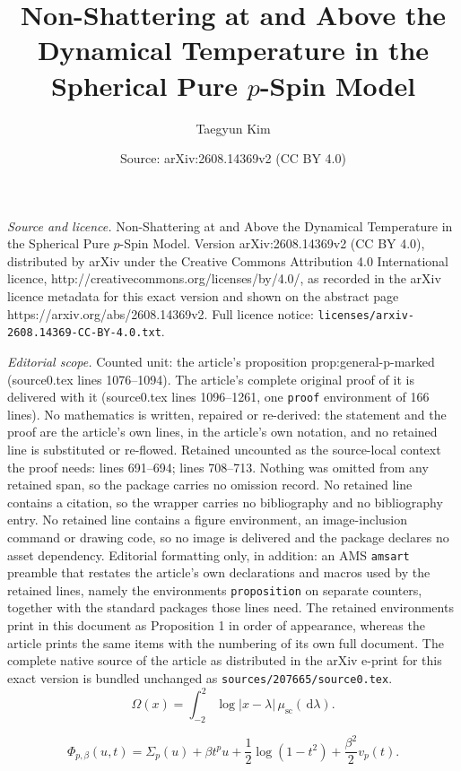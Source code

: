 \documentclass[10pt,a4paper]{amsart}
\title{Non-Shattering at and Above the Dynamical Temperature in the Spherical Pure \(p\)-Spin Model}
\author{Taegyun Kim}
\date{Source: arXiv:2608.14369v2 (CC BY 4.0)}
\newcommand{\Om}{\Omega}
\newcommand{\PhiP}{\Phi_{p,\beta}}
\newcommand{\SigmaP}{\Sigma_p}
\newcommand{\dd}{\,\mathrm d}
\begin{document}
\maketitle

\noindent\emph{Source and licence.} Non-Shattering at and Above the Dynamical Temperature in the Spherical Pure \(p\)-Spin Model. Version arXiv:2608.14369v2 (CC BY 4.0), distributed by arXiv under the Creative Commons Attribution 4.0 International licence, http://creativecommons.org/licenses/by/4.0/, as recorded in the arXiv licence metadata for this exact version and shown on the abstract page https://arxiv.org/abs/2608.14369v2. Full licence notice: \texttt{licenses/arxiv-2608.14369-CC-BY-4.0.txt}.\par\smallskip

\noindent\textit{Editorial scope.} Counted unit: the article's proposition prop:general-p-marked (source0.tex lines 1076--1094). The article's complete original proof of it is delivered with it (source0.tex lines 1096--1261, one \texttt{proof} environment of 166 lines). No mathematics is written, repaired or re-derived: the statement and the proof are the article's own lines, in the article's own notation, and no retained line is substituted or re-flowed.  Retained uncounted as the source-local context the proof needs: lines 691--694; lines 708--713.  Nothing was omitted from any retained span, so the package carries no omission record.  No retained line contains a citation, so the wrapper carries no bibliography and no bibliography entry.  No retained line contains a figure environment, an image-inclusion command or drawing code, so no image is delivered and the package declares no asset dependency.  Editorial formatting only, in addition: an AMS \texttt{amsart} preamble that restates the article's own declarations and macros used by the retained lines, namely the environments \texttt{proposition} on separate counters, together with the standard packages those lines need.  The retained environments print in this document as Proposition 1 in order of appearance, whereas the article prints the same items with the numbering of its own full document.  The complete native source of the article as distributed in the arXiv e-print for this exact version is bundled unchanged as \texttt{sources/207665/source0.tex}.
\begin{equation}\label{eq:Omega}
 \Om(x)=\int_{-2}^2\log\lvert x-\lambda\rvert\,
 \mu_{\mathrm{sc}}(\dd\lambda).
\end{equation}

\begin{equation}\label{eq:PhiGeneral}
 \PhiP(u,t)
 =\SigmaP(u)+\beta t^p u
  +\frac12\log(1-t^2)
  +\frac{\beta^2}{2}v_p(t).
\end{equation}
\end{document}
